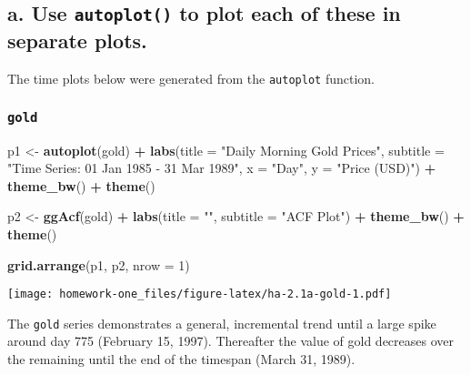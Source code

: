 \documentclass[openany]{book}
\newenvironment{Shaded}{\begin{snugshade}}{\end{snugshade}}
\newcommand{\DataTypeTok}[1]{\textcolor[rgb]{0.13,0.29,0.53}{#1}}
\newcommand{\DecValTok}[1]{\textcolor[rgb]{0.00,0.00,0.81}{#1}}
\newcommand{\KeywordTok}[1]{\textcolor[rgb]{0.13,0.29,0.53}{\textbf{#1}}}
\newcommand{\NormalTok}[1]{#1}
\newcommand{\OperatorTok}[1]{\textcolor[rgb]{0.81,0.36,0.00}{\textbf{#1}}}
\newcommand{\StringTok}[1]{\textcolor[rgb]{0.31,0.60,0.02}{#1}}
\begin{document}
\hypertarget{a.-use-autoplot-to-plot-each-of-these-in-separate-plots.}{%
\subsection{\texorpdfstring{a. Use \texttt{autoplot()} to plot each of these in separate plots.}{a. Use autoplot() to plot each of these in separate plots.}}\label{a.-use-autoplot-to-plot-each-of-these-in-separate-plots.}}

The time plots below were generated from the \texttt{autoplot} function.

\hypertarget{gold}{%
\subsubsection{\texorpdfstring{\texttt{gold}}{gold}}\label{gold}}

\begin{Shaded}
\begin{Highlighting}[]
\NormalTok{p1 <-}\StringTok{ }\KeywordTok{autoplot}\NormalTok{(gold) }\OperatorTok{+}\StringTok{ }\KeywordTok{labs}\NormalTok{(}\DataTypeTok{title =} \StringTok{"Daily Morning Gold Prices"}\NormalTok{, }
  \DataTypeTok{subtitle =} \StringTok{"Time Series: 01 Jan 1985 - 31 Mar 1989"}\NormalTok{, }
  \DataTypeTok{x =} \StringTok{"Day"}\NormalTok{, }\DataTypeTok{y =} \StringTok{"Price (USD)"}\NormalTok{) }\OperatorTok{+}\StringTok{ }\KeywordTok{theme_bw}\NormalTok{() }\OperatorTok{+}\StringTok{ }\KeywordTok{theme}\NormalTok{()}

\NormalTok{p2 <-}\StringTok{ }\KeywordTok{ggAcf}\NormalTok{(gold) }\OperatorTok{+}\StringTok{ }\KeywordTok{labs}\NormalTok{(}\DataTypeTok{title =} \StringTok{""}\NormalTok{, }\DataTypeTok{subtitle =} \StringTok{"ACF Plot"}\NormalTok{) }\OperatorTok{+}\StringTok{ }
\StringTok{  }\KeywordTok{theme_bw}\NormalTok{() }\OperatorTok{+}\StringTok{ }\KeywordTok{theme}\NormalTok{()}

\KeywordTok{grid.arrange}\NormalTok{(p1, p2, }\DataTypeTok{nrow =} \DecValTok{1}\NormalTok{)}
\end{Highlighting}
\end{Shaded}

\texttt{[image: homework-one\_files/figure-latex/ha-2.1a-gold-1.pdf]}

The \texttt{gold} series demonstrates a general, incremental trend until a large spike around day 775 (February 15, 1997). Thereafter the value of gold decreases over the remaining until the end of the timespan (March 31, 1989).
\end{document}
